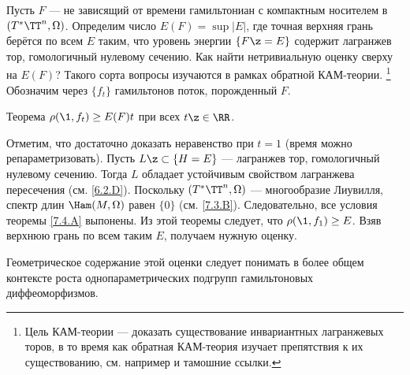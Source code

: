 Пусть $F$ --- не зависящий от времени гамильтониан с компактным носителем в $(T^\ast \TT^n, \Omega)$.
Определим число $E (F) = \sup | E |$, где точная верхняя грань берётся по всем $E$ таким, что уровень энергии $\{F \z= E\}$ содержит лагранжев тор, гомологичный нулевому сечению.
Как найти нетривиальную оценку сверху на $E (F)$?
Такого сорта вопросы изучаются в рамках обратной КАМ-теории.%
\footnote{Цель КАМ-теории --- доказать существование инвариантных лагранжевых торов, в то время как обратная КАМ-теория изучает препятствия к их существованию, см. например \cite{Mac} и тамошние ссылки.}
Обозначим через $\{f_t\}$ гамильтонов поток, порожденный $F$.

\begin{thm}{Теорема}\label{8.1.C}
$\rho (\1, f_t) \ge E (F) t$ при всех $t \z\in \RR$.
\end{thm}

Отметим, что достаточно доказать неравенство при $t = 1$ (время можно репараметризовать).
Пусть $L \z\subset \{H = E\}$ --- лагранжев тор, гомологичный нулевому сечению.
Тогда $L$ обладает устойчивым свойством лагранжева пересечения (см. \ref{6.2.D}).
Поскольку $(T^\ast \TT^n, \Omega)$ --- многообразие Лиувилля, спектр длин $\Ham (M, \Omega)$ равен $\{0\}$ (см. \ref{7.3.B}).
Следовательно, все условия теоремы \ref{7.4.A} выпонены.
Из этой теоремы следует, что $\rho (\1, f_1) \ge E$.
Взяв верхнюю грань по всем таким $E$, получаем нужную оценку.
\qeds

Геометрическое содержание этой оценки следует понимать в более общем контексте роста однопараметрических подгрупп гамильтоновых диффеоморфизмов.


